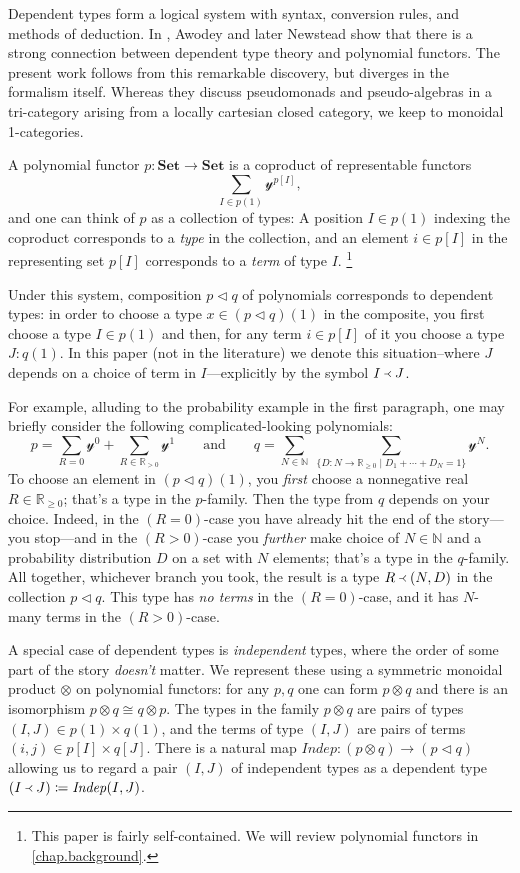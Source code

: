 \documentclass[11pt, one side, article]{memoir}
\theoremstyle{definition}
\theoremstyle{plain}
\newcommand{\Cat}[1]{\mathbf{#1}}%
\newcommand{\Fun}[1]{\mathit{#1}}%
\newcommand{\nn}{\mathbb{N}}
\newcommand{\rr}{\mathbb{R}}
\newcommand{\smset}{\Cat{Set}}
\newcommand{\yon}{\mathcal{y}}
\newcommand{\0}{\textsf{0}}
\newcommand{\1}{\tn{\textsf{1}}}
\newcommand{\tri}{\mathbin{\triangleleft}}
\newcommand{\indep}{\Fun{Indep}}
\newcommand{\founds}{\Yleft}
\newcommand{\qqand}{\qquad\text{and}\qquad}
\begin{document}
Dependent types form a logical system with syntax, conversion rules, and methods of deduction. In \cite{awodey2014natural,awodey2018polynomial}, Awodey and later Newstead show that there is a strong connection between dependent type theory and polynomial functors. The present work follows from this remarkable discovery, but diverges in the formalism itself. Whereas they discuss pseudomonads and pseudo-algebras in a tri-category arising from a locally cartesian closed category, we keep to monoidal 1-categories. 

A polynomial functor $p\colon\smset\to\smset$ is a coproduct of representable functors
\[\sum_{I\in p(1)}\yon^{p[I]},\]
and one can think of $p$ as a collection of types: A position $I\in p(1)$ indexing the coproduct corresponds to a \emph{type} in the collection, and an element $i\in p[I]$ in the representing set $p[I]$ corresponds to a \emph{term} of type $I$.%
\footnote{This paper is fairly self-contained. We will review polynomial functors in \cref{chap.background}.}

Under this system, composition $p\tri q$ of polynomials corresponds to dependent types: in order to choose a type $x\in (p\tri q)(1)$ in the composite, you first choose a type $I\in p(1)$ and then, for any term $i\in p[I]$ of it you choose a type $J:q(1)$. In this paper (not in the literature) we denote this situation--where $J$ depends on a choice of term in $I$---explicitly by the symbol $I\founds J$. 

For example, alluding to the probability example in the first paragraph,  one may briefly consider the following complicated-looking polynomials:
\[
  p=\sum_{R=0}\yon^0+\sum_{R\in\rr_{>0}}\yon^1
  \qqand 
  q=\sum_{N\in\nn}\;\sum_{\{D\colon N\to\rr_{\geq 0}\mid D_1+\cdots+D_N=1\}}\yon^N.
\]
To choose an element in $(p\tri q)(1)$, you \emph{first} choose a nonnegative real $R\in\rr_{\geq0}$; that's a type in the $p$-family. Then the type from $q$ depends on your choice. Indeed, in the $(R=0)$-case you have already hit the end of the story---you stop---and in the $(R>0)$-case you \emph{further} make choice of $N\in\nn$ and a probability distribution $D$ on a set with $N$ elements; that's a type in the $q$-family. All together, whichever branch you took, the result is a type $R\founds(N,D)$ in the collection $p\tri q$. This type has \emph{no terms} in the $(R=0)$-case, and it has $N$-many terms in the $(R>0)$-case.

A special case of dependent types is \emph{independent} types, where the order of some part of the story \emph{doesn't} matter. We represent these using a symmetric monoidal product $\otimes$ on polynomial functors: for any $p,q$ one can form $p\otimes q$ and there is an isomorphism $p\otimes q\cong q\otimes p$. The types in the family $p\otimes q$ are pairs of types $(I,J)\in p(1)\times q(1)$, and the terms of type $(I,J)$ are pairs of terms $(i,j)\in p[I]\times q[J]$. There is a natural map $\indep\colon(p\otimes q)\to (p\tri q)$ allowing us to regard a pair $(I,J)$ of independent types as a dependent type $(I\founds J)\coloneqq\indep(I,J)$.
\end{document}

